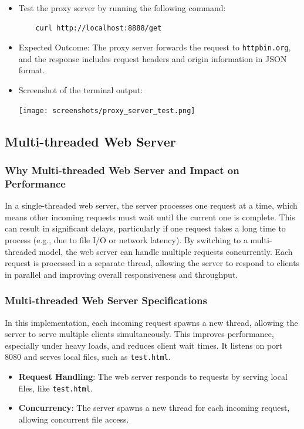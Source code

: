 \documentclass{article}
\begin{document}
\begin{itemize}
    \item Test the proxy server by running the following command:
    \begin{lstlisting}
    curl http://localhost:8888/get
    \end{lstlisting}
    \item Expected Outcome: The proxy server forwards the request to \texttt{httpbin.org}, and the response includes request headers and origin information in JSON format.
    \item Screenshot of the terminal output:
    \begin{center}
        \texttt{[image: screenshots/proxy\_server\_test.png]}  %
    \end{center}
\end{itemize}

\subsection*{Multi-threaded Web Server}

\subsubsection*{Why Multi-threaded Web Server and Impact on Performance}

In a single-threaded web server, the server processes one request at a time, which means other incoming requests must wait until the current one is complete. This can result in significant delays, particularly if one request takes a long time to process (e.g., due to file I/O or network latency). By switching to a multi-threaded model, the web server can handle multiple requests concurrently. Each request is processed in a separate thread, allowing the server to respond to clients in parallel and improving overall responsiveness and throughput.

\subsubsection*{Multi-threaded Web Server Specifications}
In this implementation, each incoming request spawns a new thread, allowing the server to serve multiple clients simultaneously. This improves performance, especially under heavy loads, and reduces client wait times. It listens on port 8080 and serves local files, such as \texttt{test.html}.

\begin{itemize}
    \item \textbf{Request Handling}: The web server responds to requests by serving local files, like \texttt{test.html}.
    \item \textbf{Concurrency}: The server spawns a new thread for each incoming request, allowing concurrent file access.
\end{itemize}
\end{document}
